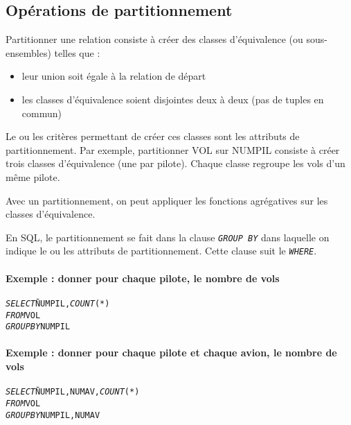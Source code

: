 \documentclass[10pt]{article}
\begin{document}
		\subsection{Opérations de partitionnement}
			Partitionner une relation consiste à créer des classes d'équivalence (ou sous-ensembles) telles que :
			\begin{itemize}
				\item leur union soit égale à la relation de départ
				\item les classes d'équivalence soient disjointes deux à deux (pas de tuples en commun)
			\end{itemize}
			
			Le ou les critères permettant de créer ces classes sont les attributs de partitionnement. Par exemple, partitionner VOL sur NUMPIL consiste à créer trois classes d'équivalence (une par pilote). Chaque classe regroupe les vols d'un même pilote.
			
			Avec un partitionnement, on peut appliquer les fonctions agrégatives sur les classes d'équivalence.
			
			En SQL, le partitionnement se fait dans la clause \emph{\texttt{GROUP BY}} dans laquelle on indique le ou les attributs de partitionnement. Cette clause suit le \emph{\texttt{WHERE}}.
			
			\paragraph{Exemple : donner pour chaque pilote, le nombre de vols}
				\begin{alltt}
					\begin{tabbing}
						\emph{SELECT} \= NUMPIL, \emph{COUNT}(*)\\
						\emph{FROM} \> VOL\\
						\emph{GROUP BY} \> NUMPIL
					\end{tabbing}
				\end{alltt}
				
			\paragraph{Exemple : donner pour chaque pilote et chaque avion, le nombre de vols}
				\begin{alltt}
					\begin{tabbing}
						\emph{SELECT} \= NUMPIL, NUMAV, \emph{COUNT}(*)\\
						\emph{FROM} \> VOL\\
						\emph{GROUP BY} \> NUMPIL, NUMAV
					\end{tabbing}
				\end{alltt}
				
\end{document}
